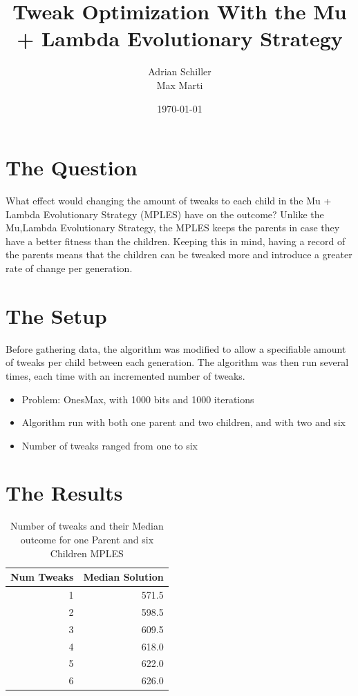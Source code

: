 \documentclass[10pt]{article}
\title{Tweak Optimization With the Mu + Lambda Evolutionary Strategy}
\date{\today}
\author{Adrian Schiller \\  Max Marti}
\begin{document}
\maketitle


\section{The Question}
 What effect would changing the amount of tweaks to each child in the Mu + Lambda Evolutionary Strategy (MPLES) have on the outcome? Unlike the Mu,Lambda Evolutionary Strategy, the MPLES keeps the parents in case they have a better fitness than the children. Keeping this in mind, having a record of the parents means that the children can be tweaked more and introduce a greater rate of change per generation.  
 
\section{The Setup}
\label{sec:setup}


Before gathering data, the algorithm was modified to allow a specifiable amount of tweaks per child between each generation. The algorithm was then run several times, each time with an incremented number of tweaks.
\begin{itemize}
\item Problem: OnesMax, with 1000 bits and 1000 iterations
\item Algorithm run with both one parent and two children, and with two and six
\item Number of tweaks ranged from one to six
\end{itemize}








\section{The Results}

\begin{table}[H]
\begin{center}
\begin{tabular}{r r}
Num Tweaks & Median Solution \\
\hline
1 & 571.5\\
2 & 598.5\\
3 & 609.5\\
4 & 618.0\\
5 & 622.0\\
6 & 626.0\\

\end{tabular}
\end{center}
\caption{Number of tweaks and their Median outcome for one Parent and six Children MPLES }
\label{tab:setup}
\end{table}
\end{document}
